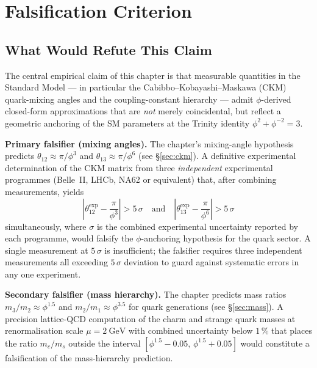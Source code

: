 \section{Falsification Criterion}\label{fa_20:sec:20-falsify}

\subsection{What Would Refute This Claim}

The central empirical claim of this chapter is that measurable
quantities in the Standard Model — in particular the
Cabibbo--Kobayashi--Maskawa (CKM) quark-mixing angles and the
coupling-constant hierarchy — admit $\phi$-derived closed-form
approximations that are \emph{not} merely coincidental, but reflect a
geometric anchoring of the SM parameters at the Trinity identity
$\phi^2 + \phi^{-2} = 3$.

\medskip
\noindent\textbf{Primary falsifier (mixing angles).}
The chapter's mixing-angle hypothesis predicts
$\theta_{12} \approx \pi/\phi^3$ and $\theta_{13} \approx \pi/\phi^6$
(see \S\ref{sec:ckm}).  A definitive experimental determination of the
CKM matrix from three \emph{independent} experimental programmes
(Belle~II, LHCb, NA62 or equivalent) that, after combining
measurements, yields
\begin{equation}
  \left\lvert \theta_{12}^{\mathrm{exp}} - \frac{\pi}{\phi^3}
  \right\rvert > 5\,\sigma
  \quad\text{and}\quad
  \left\lvert \theta_{13}^{\mathrm{exp}} - \frac{\pi}{\phi^6}
  \right\rvert > 5\,\sigma
\end{equation}
simultaneously, where $\sigma$ is the combined experimental
uncertainty reported by each programme, would falsify the
$\phi$-anchoring hypothesis for the quark sector.  A single
measurement at $5\,\sigma$ is insufficient; the falsifier requires
three independent measurements all exceeding $5\,\sigma$ deviation to
guard against systematic errors in any one experiment.

\medskip
\noindent\textbf{Secondary falsifier (mass hierarchy).}
The chapter predicts mass ratios
$m_3/m_2 \approx \phi^{1.5}$ and $m_2/m_1 \approx \phi^{3.5}$ for
quark generations (see \S\ref{sec:mass}).  A precision lattice-QCD
computation of the charm and strange quark masses at renormalisation
scale $\mu = 2\ \mathrm{GeV}$ with combined uncertainty below
$1\,\%$ that places the ratio $m_c/m_s$ outside the interval
$[\phi^{1.5} - 0.05,\, \phi^{1.5} + 0.05]$
would constitute a falsification of the mass-hierarchy prediction.


